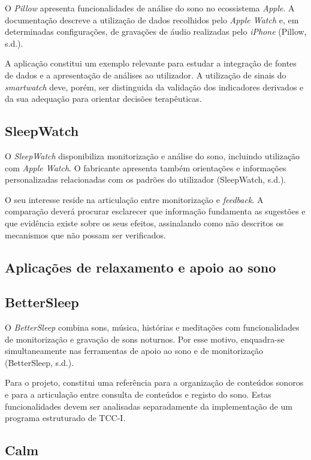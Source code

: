 O \textit{Pillow} apresenta funcionalidades de análise do sono no ecossistema \textit{Apple}. A documentação descreve a utilização de dados recolhidos pelo \textit{Apple Watch} e, em determinadas configurações, de gravações de áudio realizadas pelo \textit{iPhone} (Pillow, s.d.).

A aplicação constitui um exemplo relevante para estudar a integração de fontes de dados e a apresentação de análises ao utilizador. A utilização de sinais do \textit{smartwatch} deve, porém, ser distinguida da validação dos indicadores derivados e da sua adequação para orientar decisões terapêuticas.

\subsection*{SleepWatch}

O \textit{SleepWatch} disponibiliza monitorização e análise do sono, incluindo utilização com \textit{Apple Watch}. O fabricante apresenta também orientações e informações personalizadas relacionadas com os padrões do utilizador (SleepWatch, s.d.).

O seu interesse reside na articulação entre monitorização e \textit{feedback}. A comparação deverá procurar esclarecer que informação fundamenta as sugestões e que evidência existe sobre os seus efeitos, assinalando como não descritos os mecanismos que não possam ser verificados.


\subsection{Aplicações de relaxamento e apoio ao sono}

\subsection*{BetterSleep}

O \textit{BetterSleep} combina sons, música, histórias e meditações com funcionalidades de monitorização e gravação de sons noturnos. Por esse motivo, enquadra-se simultaneamente nas ferramentas de apoio ao sono e de monitorização (BetterSleep, s.d.).

Para o projeto, constitui uma referência para a organização de conteúdos sonoros e para a articulação entre consulta de conteúdos e registo do sono. Estas funcionalidades devem ser analisadas separadamente da implementação de um programa estruturado de TCC-I.

\subsection*{Calm}

